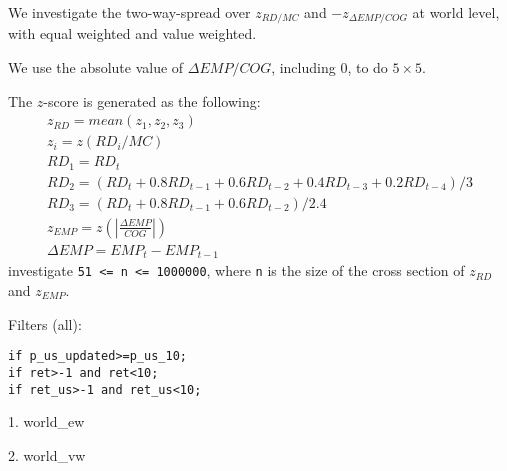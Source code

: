 

\usepackage[T1]{fontenc}




\thispagestyle{fancy}

\newcommand{\code}{\texttt}
\newcommand*{\Commonpath}{20190107/two-way/EMP2}


We investigate the two-way-spread over $z_{RD/MC}$ and $-z_{\Delta EMP/COG}$ at world level, with equal weighted and value weighted. 

We use the absolute value of $\Delta EMP/COG$, including 0, to do $5\times5$.

The $z$-score is generated as the following:
$$
\begin{aligned}
& z_{RD} = mean(z_1, z_2, z_3) \\
& z_i = z(RD_i/MC) \\
& RD_1 = RD_t \\
& RD_2 = (RD_t + 0.8RD_{t-1} + 0.6RD_{t-2} + 0.4RD_{t-3} + 0.2RD_{t-4})/3 \\
& RD_3 = (RD_t + 0.8RD_{t-1} + 0.6RD_{t-2})/2.4 
& \\
& z_{EMP} = z(|\frac{\Delta EMP}{COG}|) \\
& \Delta EMP = EMP_t - EMP_{t-1}
\end{aligned}
$$
investigate
\code{51 <= n <= 1000000}, where \code{n} is the size of the cross section of $z_{RD}$ and $z_{EMP}$.

Filters (all):

\code{if p\_us\_updated>=p\_us\_10;} \\
\code{if ret>-1 and ret<10;} \\
\code{if ret\_us>-1 and ret\_us<10;} \\


\small

1. world\_ew


2. world\_vw




